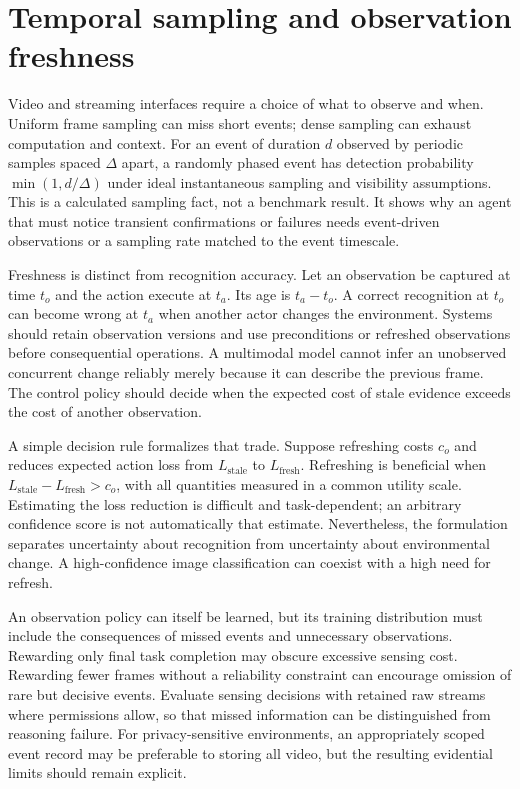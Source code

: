 \section{Temporal sampling and observation freshness}
\label{sec:C05:time}
Video and streaming interfaces require a choice of what to observe and when. Uniform frame sampling can miss short events; dense sampling can exhaust computation and context. For an event of duration $d$ observed by periodic samples spaced $\Delta$ apart, a randomly phased event has detection probability $\min(1,d/\Delta)$ under ideal instantaneous sampling and visibility assumptions. This is a calculated sampling fact, not a benchmark result. It shows why an agent that must notice transient confirmations or failures needs event-driven observations or a sampling rate matched to the event timescale.

Freshness is distinct from recognition accuracy. Let an observation be captured at time $t_o$ and the action execute at $t_a$. Its age is $t_a-t_o$. A correct recognition at $t_o$ can become wrong at $t_a$ when another actor changes the environment. Systems should retain observation versions and use preconditions or refreshed observations before consequential operations. A multimodal model cannot infer an unobserved concurrent change reliably merely because it can describe the previous frame. The control policy should decide when the expected cost of stale evidence exceeds the cost of another observation.

A simple decision rule formalizes that trade. Suppose refreshing costs $c_o$ and reduces expected action loss from $L_{\mathrm{stale}}$ to $L_{\mathrm{fresh}}$. Refreshing is beneficial when $L_{\mathrm{stale}}-L_{\mathrm{fresh}}>c_o$, with all quantities measured in a common utility scale. Estimating the loss reduction is difficult and task-dependent; an arbitrary confidence score is not automatically that estimate. Nevertheless, the formulation separates uncertainty about recognition from uncertainty about environmental change. A high-confidence image classification can coexist with a high need for refresh.

An observation policy can itself be learned, but its training distribution must include the consequences of missed events and unnecessary observations. Rewarding only final task completion may obscure excessive sensing cost. Rewarding fewer frames without a reliability constraint can encourage omission of rare but decisive events. Evaluate sensing decisions with retained raw streams where permissions allow, so that missed information can be distinguished from reasoning failure. For privacy-sensitive environments, an appropriately scoped event record may be preferable to storing all video, but the resulting evidential limits should remain explicit.

